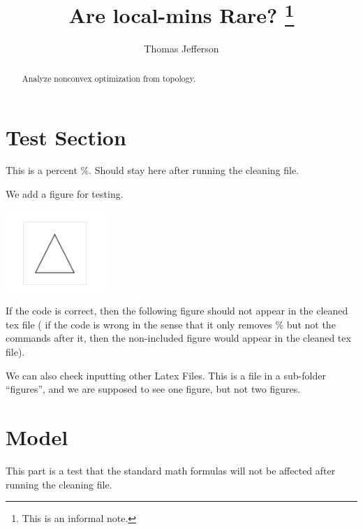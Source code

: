 \documentclass{article}%
\title{ \bf Are local-mins Rare?
 \footnote{This is an informal note. }
} \vskip 1cm
\author{ Thomas Jefferson
}
\date{}
\begin{document}
\maketitle

\begin{abstract}

Analyze nonconvex optimization from topology. 

\end{abstract}

\thispagestyle{empty}




\section{Test Section}

This is a percent \%.  Should stay here after running the cleaning file. 

We add a figure for testing. 

\includegraphics{images/im1_included.png}

If the code is correct, then the following figure should not appear in the cleaned tex file (
if the code is wrong in the sense that it only removes $\%$ but not the commands
after it, then the non-included figure would appear in the cleaned tex  file).


We can also check inputting other Latex Files.
This is a file in a sub-folder ``figures'', and we are supposed to see
one figure, but not two figures. 





\section{Model}

This part is a test that the standard math formulas will not be affected after
running the cleaning file. 
\end{document}
